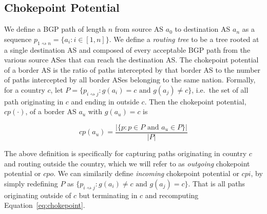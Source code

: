
\subsection{Chokepoint Potential}

We define a BGP path of length $n$ from source AS $a_0$ to destination AS $a_n$
as a sequence $p_{1\rightsquigarrow n} = \{a_i : i \in [1,n]\}$.  We define a
\textit{routing tree} to be a tree rooted at a single destination AS and
composed of every acceptable BGP path from the various source ASes that can
reach the destination AS.  The
chokepoint potential of a border AS is the ratio of paths intercepted by that
border AS to the number of paths intercepted by all border ASes belonging to
the same nation. Formally, for a country $c$, let $P = \{p_{i \rightsquigarrow
j} : g(a_i)=c \text{ and } g(a_j)\neq c\} $, i.e.\ the set of all path
originating in $c$ and ending in outside $c$. Then the chokepoint potential,
$cp(\cdot)$, of a border AS $a_u$ with $g(a_u) = c$ is

\begin{equation}
  \label{eq:chokepoint}
  cp(a_u) = \frac{|\{p: p \in P \text{ and } a_u \in P\}|}{|P|}
\end{equation}

The above definition is specifically for capturing paths originating in country
$c$ and routing outside the country, which we will refer to as
\textit{outgoing} chokepoint potential or $cpo$. We can similarily define
\textit{incoming} chokepoint potential or $cpi$, by simply redefining $P$ as $\{p_{i
\rightsquigarrow j}: g(a_i) \neq c \text{ and } g(a_j) = c\}$. That is all
paths originating outside of $c$ but terminating in $c$ and recomputing
Equation~\ref{eq:chokepoint}. 

